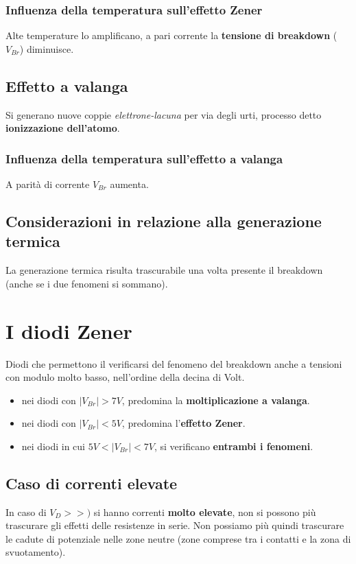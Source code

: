 \documentclass[11pt,a4paper,]{article}
\begin{document}
\subsubsection{Influenza della temperatura sull'effetto Zener}
Alte temperature lo amplificano, a pari corrente la \textbf{tensione di breakdown} ($V_{Br}$) diminuisce.
\subsection{Effetto a valanga}
Si generano nuove coppie \textit{elettrone-lacuna} per via degli urti, processo detto \textbf{ionizzazione dell'atomo}.
\subsubsection{Influenza della temperatura sull'effetto a valanga}
A parità di corrente $V_{Br}$ aumenta.
\subsection{Considerazioni in relazione alla generazione termica}
La generazione termica risulta trascurabile una volta presente il breakdown (anche se i due fenomeni si sommano).

\section{I diodi Zener}
\begin{definizione}
    Diodi che permettono il verificarsi del fenomeno del breakdown anche a tensioni con modulo molto basso, nell'ordine della decina di Volt.
    \begin{itemize}
        \item nei diodi con $|V_{Br}| > 7V$, predomina la \textbf{moltiplicazione a valanga}.
        \item nei diodi con $|V_{Br}| < 5V$, predomina l'\textbf{effetto Zener}.
        \item nei diodi in cui $5V < |V_{Br}| < 7V$, si verificano \textbf{entrambi i fenomeni}.
\end{itemize}
\end{definizione}
\subsection{Caso di correnti elevate}
In caso di $V_D>>)$ si hanno correnti \textbf{molto elevate}, non si possono più trascurare gli effetti delle resistenze in serie.
Non possiamo più quindi trascurare le cadute di potenziale nelle zone neutre (zone comprese tra i contatti e la zona di svuotamento).
\end{document}
